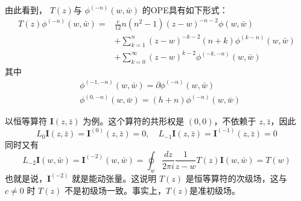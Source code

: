 由此看到， $T(z) $与 $\phi^{(-n)}(w, \bar{w})$ 的OPE具有如下形式：
\begin{equation}
	\begin{aligned} T(z) \phi^{(-n)}(w, \bar{w})=& \frac{c}{12} n\left(n^{2}-1\right)(z-w)^{-n-2} \phi(w, \bar{w}) \\ &+\sum_{k=1}^{n}(z-w)^{-k-2}(n+k) \phi^{(k-n)}(w, \bar{w}) \\ &+\sum_{k=0}^{\infty}(z-w)^{k-2} \phi^{(-k,-n)}(w, \bar{w}) \end{aligned}
\end{equation}
其中
\begin{equation}
	\begin{aligned} &\phi^{(-1,-n)}(w, \bar{w})=\partial \phi^{(-n)}(w, \bar{w}) \\ &\phi^{(0,-n)}(w, \bar{w})=(h+n) \phi^{(-n)}(w, \bar{w}) \end{aligned}
\end{equation}

以恒等算符 $\boldsymbol{I}(z, \bar{z})$ 为例。这个算符的共形权是 $(0,0) $，不依赖于 $z,\bar{z} $，因此
\begin{equation}
	L_{0} \boldsymbol{I}(z, \bar{z})=\boldsymbol{I}^{(0)}(z, \bar{z})=0, \quad L_{-1} \boldsymbol{I}(z, \bar{z})=\boldsymbol{I}^{(-1)}(z, \bar{z})=0
\end{equation}
同时又有
\begin{equation}
	L_{-2} \boldsymbol{I}(w, \bar{w})=\boldsymbol{I}^{(-2)}(w, \bar{w})=\oint_{w} \frac{d z}{2 \pi i} \frac{1}{z-w} T(z) \boldsymbol{I}(w, \bar{w})=T(w)
\end{equation}
也就是说，$ \boldsymbol{I}^{(-2)}$ 就是能动张量。这说明 $T(z)$ 是恒等算符的次级场，这与 $c\neq0$ 时 $T(z)$ 不是初级场一致。事实上，$ T(z) $是准初级场。

